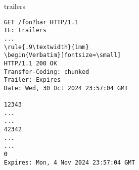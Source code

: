\begin{frame}[fragile]{trailers}
\begin{Verbatim}[fontsize=\small]
GET /foo?bar HTTP/1.1
TE: trailers
...
\rule{.9\textwidth}{1mm}
\begin{Verbatim}[fontsize=\small]
HTTP/1.1 200 OK
Transfer-Coding: chunked
Trailer: Expires
Date: Wed, 30 Oct 2024 23:57:04 GMT

12343
...
...
42342
...
...
0
Expires: Mon, 4 Nov 2024 23:57:04 GMT
\end{Verbatim}
\end{frame}
